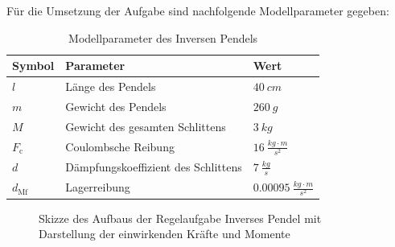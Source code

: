 \documentclass[
	pagesize,
	fontsize=12pt,
	paper=a4,
	oneside,
   reqno
]{scrartcl}
\begin{document}
Für die Umsetzung der Aufgabe sind nachfolgende Modellparameter gegeben:

\begin{table}[H]
    \centering
    \begin{tabular}{lll}
        \hline
        Symbol   & Parameter                           & Wert                                   \\ \hline
        $l$      & Länge des Pendels                   & $\SI{40}{cm}$                          \\
        $m$      & Gewicht des Pendels                 & $\SI{260}{g}$                          \\
        $M$      & Gewicht des gesamten Schlittens     & $\SI{3}{kg}$                           \\
        $F_{\mathrm{c}}$    & Coulombsche Reibung                 & $\SI{16}{\frac{kg \cdot m}{s^2}}$      \\
        $d$      & Dämpfungskoeffizient des Schlittens & $\SI{7}{\frac{kg}{s}}$                 \\
        $d_{\mathrm{Mf}}$ & Lagerreibung                        & $\SI{0.00095}{\frac{kg \cdot m}{s^2}}$ \\ \hline
    \end{tabular}
    \caption{Modellparameter des Inversen Pendels}
    \label{tab:my-table1}
\end{table}

\begin{figure}[H]
   \centering
   \caption[Skizze des Aufbaus der Regelaufgabe]{Skizze des Aufbaus der Regelaufgabe Inverses Pendel mit Darstellung der einwirkenden Kräfte und Momente}
   \label{fig:Bild1}
\end{figure}
\end{document}
